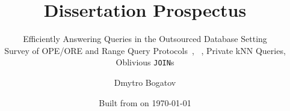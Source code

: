 \title{Dissertation Prospectus}

\subtitle{
	Efficiently Answering Queries in the Outsourced Database Setting \\
	{\small Survey of OPE/ORE and Range Query Protocols~\cite{ore-benchmark-17}, \epsolute{}~\cite{epsolute}, Private kNN Queries, Oblivious \texttt{JOIN}s}
}

\date{Built from \href{https://git.dbogatov.org/bu/proposal/presentation/commit/\version}{\emph{\version}} on \today}

\author{Dmytro Bogatov \\ }


\def\wm{\begin{tabular}{c} Dmytro Bogatov \\ Boston University \end{tabular}}
